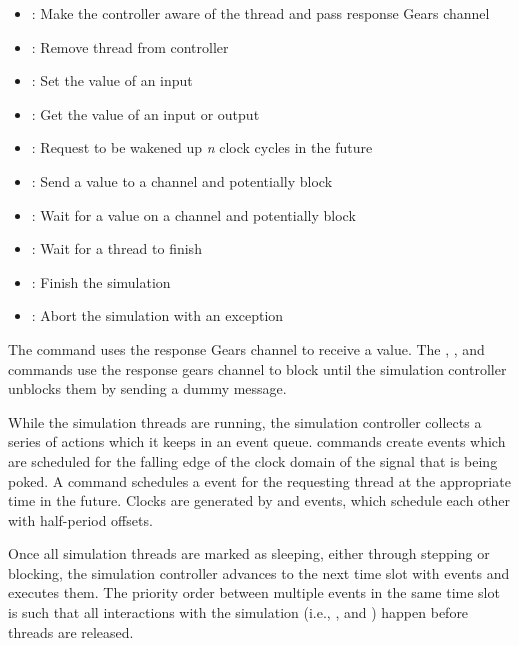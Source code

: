 \begin{itemize}
  \item {}: Make the controller aware of the thread and pass response Gears channel
  \item {}: Remove thread from controller
  \item {}: Set the value of an input
  \item {}: Get the value of an input or output
  \item {}: Request to be wakened up \textit{n} clock cycles in the future
  \item {}: Send a value to a channel and potentially block
  \item {}: Wait for a value on a channel and potentially block
  \item {}: Wait for a thread to finish
  \item {}: Finish the simulation
  \item {}: Abort the simulation with an exception
\end{itemize}

The  command uses the response Gears channel to receive a value. The , ,
 and  commands use the response gears channel to block until the simulation
controller unblocks them by sending a dummy message.

While the simulation threads are running, the simulation controller collects a series of actions which it keeps
in an event queue.  commands create  events which are scheduled for the falling edge of the
clock domain of the signal that is being poked. A  command schedules a  event for the
requesting thread at the appropriate time in the future. Clocks are generated by  and 
events, which schedule each other with half-period offsets.

Once all simulation threads are marked as sleeping, either through stepping or blocking, the simulation controller
advances to the next time slot with events and executes them. The priority order between multiple events in the same
time slot is such that all interactions with the simulation (i.e., ,  and )
happen before threads are released.



